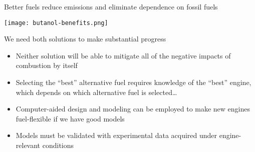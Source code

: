 \documentclass{beamer}
\begin{document}
\begin{frame}{Better fuels reduce emissions and eliminate dependence on fossil fuels}
    \begin{center}
        \texttt{[image: butanol-benefits.png]}
    \end{center}
\end{frame}

\begin{frame}{We need both solutions to make substantial progress}
    \begin{itemize}
        \item Neither solution will be able to mitigate all of the negative impacts of combustion by itself
        \item Selecting the “best” alternative fuel requires knowledge of the “best” engine, which depends on which alternative fuel is selected…
        \item Computer-aided design and modeling can be employed to make new engines fuel-flexible \alert{if} we have good models
        \item Models must be validated with experimental data acquired under engine-relevant conditions
    \end{itemize}
\end{frame}
\end{document}
